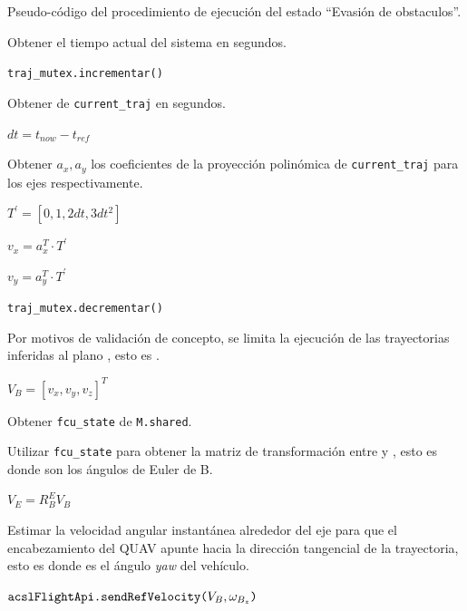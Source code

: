 \begin{algorithm}
\caption{Pseudo-código del procedimiento de ejecución del estado ``Evasión de obstaculos''. }
\label{alg:traj-execution}

Obtener el tiempo actual del sistema  en segundos.

\texttt{traj\_mutex.incrementar()}

Obtener  de \texttt{current\_traj} en segundos.

$dt = t_{now} - t_{ref}$


Obtener $a_x, a_y$ los coeficientes de la proyección polinómica de \texttt{current\_traj} para los ejes  respectivamente.

$T^\prime = [0, 1, 2dt, 3dt^2]$

$v_x = a_{x}^T \cdot T^\prime$

$v_y = a_{y}^T \cdot T^\prime$

\texttt{traj\_mutex.decrementar()}

Por motivos de validación de concepto, se limita la ejecución de las trayectorias inferidas al plano , esto es .

$V_{B} = [v_x, v_y, v_z]^T$

Obtener \texttt{fcu\_state} de \texttt{M.shared}.

Utilizar \texttt{fcu\_state} para obtener la matriz de transformación entre  y , esto es  donde \jim{\phi,\theta,\psi} son los ángulos de Euler de B. 

$V_{E} = R_{B}^{E} V_{B}$

Estimar la velocidad angular instantánea alrededor del eje  para que el encabezamiento del QUAV apunte hacia la dirección tangencial de la trayectoria, esto es  donde \jim{\psi} es el ángulo \textit{yaw} del vehículo.

$\text{\texttt{acslFlightApi.sendRefVelocity(}}V_{B}, \omega_{B_z}\text{\texttt{)}}$

\end{algorithm}


